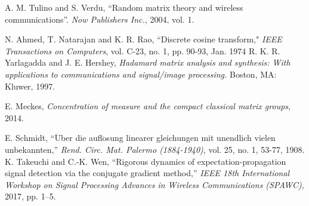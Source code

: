 \documentclass[journal]{IEEEtran}
\newcommand{\mr}{\mathrm}
\begin{document}
\begin{thebibliography}{1}



A. M. Tulino and S. Verdu, ``Random matrix theory and wireless communications''. \textit{Now Publishers Inc.}, 2004, vol. 1.

N. Ahmed, T. Natarajan and K. R. Rao, ``Discrete cosine transform," \textit{IEEE Transactions on Computers}, vol. C-23, no. 1, pp. 90-93, Jan. 1974
R. K. R. Yarlagadda and J. E. Hershey, \textit{Hadamard matrix analysis and synthesis: With applications to communications and signal/image processing.} Boston, MA: Kluwer, 1997.

E. Meckes, \textit{Concentration of measure and the compact classical matrix groups}, 2014.

E. Schmidt, ``$\mr{\ddot{U}}$ber die aufl$\mr{\ddot{o}}$sung linearer gleichungen mit unendlich vielen unbekannten,'' \textit{Rend. Circ. Mat. Palermo (1884-1940)}, vol. 25, no. 1, 53-77, 1908.
K. Takeuchi and C.-K. Wen, “Rigorous dynamics of expectation-propagation signal detection via the conjugate gradient method,” \textit{IEEE 18th International Workshop on Signal Processing Advances in Wireless Communications (SPAWC)}, 2017, pp. 1–5. 


\end{thebibliography}
\end{document}

